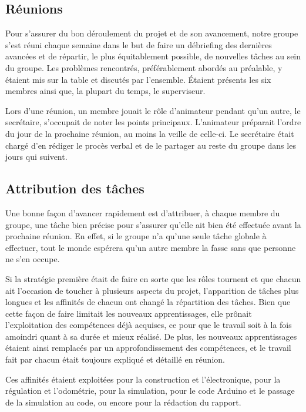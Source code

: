 \documentclass[a4paper,11pt]{article}
\begin{document}
\subsection{Réunions}

Pour s'assurer du bon déroulement du projet et de son avancement, notre groupe s'est réuni chaque semaine dans le but de faire un débriefing des dernières avancées et de répartir, le plus équitablement possible, de nouvelles tâches au sein du groupe. Les problèmes rencontrés, préférablement abordés au préalable, y étaient mis sur la table et discutés par l'ensemble. Étaient présents les six membres ainsi que, la plupart du temps, le superviseur.

Lors d'une réunion, un membre jouait le rôle d'animateur pendant qu'un autre, le secrétaire, s'occupait de noter les points principaux. L'animateur préparait l'ordre du jour de la prochaine réunion, au moins la veille de celle-ci. Le secrétaire était chargé d'en rédiger le procès verbal et de le partager au reste du groupe dans les jours qui suivent.

\subsection{Attribution des tâches}

Une bonne façon d'avancer rapidement est d'attribuer, à chaque membre du groupe, une tâche bien précise pour s'assurer qu'elle ait bien été effectuée avant la prochaine réunion. En effet, si le groupe n'a qu'une seule tâche globale à effectuer, tout le monde espérera qu'un autre membre la fasse sans que personne ne s'en occupe.

Si la stratégie première était de faire en sorte que les rôles tournent et que chacun ait l'occasion de toucher à plusieurs aspects du projet, l'apparition de tâches plus longues et les affinités de chacun ont changé la répartition des tâches. Bien que cette façon de faire limitait les nouveaux apprentissages, elle prônait l'exploitation des compétences déjà acquises, ce pour que le travail soit à la fois amoindri quant à sa durée et mieux réalisé. De plus, les nouveaux apprentissages étaient ainsi remplacés par un approfondissement des compétences, et le travail fait par chacun était toujours expliqué et détaillé en réunion.

Ces affinités étaient exploitées pour la construction et l'électronique, pour la régulation et l'odométrie, pour la simulation, pour le code Arduino et le passage de la simulation au code, ou encore pour la rédaction du rapport.
\end{document}
